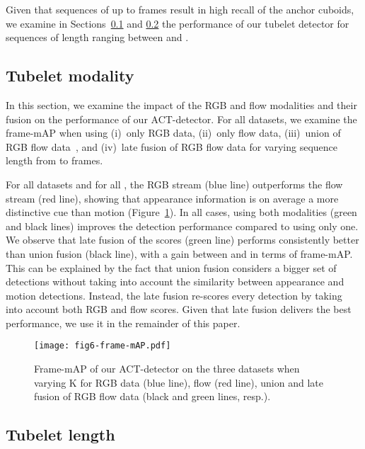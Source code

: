 \documentclass[10pt,twocolumn,letterpaper]{article}
\begin{document}
Given that sequences of up to  frames result in high recall of the anchor cuboids, we examine in Sections~\ref{sub:modality} and \ref{sub:snippet} the performance of our tubelet detector for sequences of length ranging between  and . 



\subsection{Tubelet modality}
\label{sub:modality}

In this section, we examine the impact of the RGB and flow modalities and their fusion on the performance of our ACT-detector. For all datasets, we examine the frame-mAP when using (i)~only RGB data, (ii)~only flow data, (iii)~union of RGB  flow data~\cite{Suman16bmvc}, and (iv)~late fusion of RGB  flow data for varying sequence length from  to  frames. 

For all datasets and for all , the RGB stream (blue line) outperforms the flow stream (red line), showing that appearance information is on average a more distinctive cue than motion (Figure~\ref{fig:frameAP}).  
In all cases, using both modalities (green and black lines) improves the detection performance compared to using only one.  
We observe that late fusion of the scores (green line) performs consistently better than union fusion (black line), with a gain between  and  in terms of frame-mAP. This can be explained by the fact that union fusion considers a bigger set of detections without taking into account the similarity between appearance and motion detections. Instead, the late fusion re-scores every detection by taking into account both RGB and flow scores. Given that late fusion delivers the best performance, we use it in the remainder of this paper.

\begin{figure}[t]
\texttt{[image: fig6-frame-mAP.pdf]}
\vspace{-4mm}
\caption{Frame-mAP of our ACT-detector on the three datasets when varying K for RGB data (blue line), flow (red line), union and late fusion of RGB  flow data (black and green lines, resp.).}
\label{fig:frameAP}
\vspace{-5mm}
\end{figure}

\subsection{Tubelet length}
\label{sub:snippet}
\end{document}
